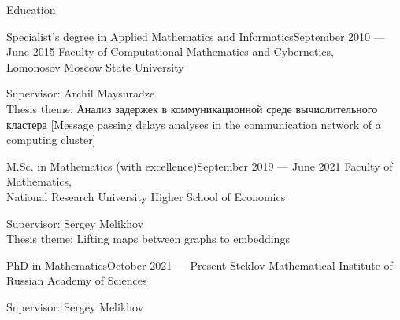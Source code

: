 \documentclass{resume}
\begin{document}
\begin{rSection}{Education}
\begin{rSubsection}{Specialist's degree in Applied Mathematics and Informatics}{September 2010 --- \newline 
    June 2015}{}
  Faculty of Computational Mathematics and Cybernetics, \\
  Lomonosov Moscow State University \vspace{0.5em}

  Supervisor: Archil Maysuradze \\
  Thesis theme: Анализ задержек в коммуникационной среде вычислительного кластера [Message passing delays analyses in the communication network of a computing cluster]
\end{rSubsection}

\begin{rSubsection}{M.Sc. in Mathematics (with excellence)}{September 2019 --- \newline June 2021}{}
  Faculty of Mathematics, \\
  National Research University Higher School of Economics \vspace{0.5em}

  Supervisor: Sergey Melikhov \\
  Thesis theme: Lifting maps between graphs to embeddings
\end{rSubsection}

\begin{rSubsection}{PhD in Mathematics}{October 2021 --- Present}{}
  Steklov Mathematical Institute of Russian Academy of Sciences\vspace{0.5em}

  Supervisor: Sergey Melikhov
\end{rSubsection}
\end{rSection}
\end{document}
